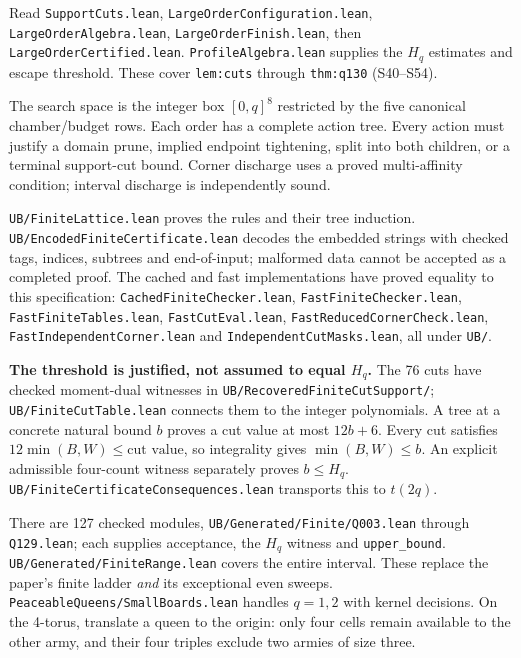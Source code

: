 \documentclass[11pt,a4paper]{article}
\newcommand{\topic}[1]{\par\vspace{6pt}{\large\bfseries\color{ink}#1}\par\vspace{2pt}}
\newcommand{\file}[1]{\mbox{\small\nolinkurl{#1}}}
\newcommand{\paperref}[1]{{\small\texttt{#1}}}
\begin{document}
Read \file{SupportCuts.lean}, \file{LargeOrderConfiguration.lean},
\file{LargeOrderAlgebra.lean}, \file{LargeOrderFinish.lean}, then
\file{LargeOrderCertified.lean}. \file{ProfileAlgebra.lean} supplies the
$H_q$ estimates and escape threshold. These cover \paperref{lem:cuts}
through \paperref{thm:q130} (S40--S54).

\newpage
\topic{The finite proof: $3\le q\le129$}
The search space is the integer box $[0,q]^8$ restricted by the five canonical
chamber/budget rows. Each order has a complete action tree. Every action
must justify a domain prune, implied endpoint tightening, split into both
children, or a terminal support-cut bound. Corner discharge uses a proved
multi-affinity condition; interval discharge is independently sound.

\file{UB/FiniteLattice.lean} proves the rules and their tree induction.
\file{UB/EncodedFiniteCertificate.lean} decodes the embedded strings with
checked tags, indices, subtrees and end-of-input; malformed data cannot be
accepted as a completed proof. The cached and fast implementations have
proved equality to this specification:
\file{CachedFiniteChecker.lean}, \file{FastFiniteChecker.lean},
\file{FastFiniteTables.lean}, \file{FastCutEval.lean},
\file{FastReducedCornerCheck.lean}, \file{FastIndependentCorner.lean}
and \file{IndependentCutMasks.lean}, all under \file{UB/}.

\textbf{The threshold is justified, not assumed to equal $H_q$.}
The 76 cuts have checked moment-dual witnesses in
\file{UB/RecoveredFiniteCutSupport/}; \file{UB/FiniteCutTable.lean}
connects them to the integer polynomials. A tree at a concrete natural bound
$b$ proves a cut value at most $12b+6$. Every cut satisfies
$12\min(B,W)\le\text{cut value}$, so integrality gives $\min(B,W)\le b$.
An explicit admissible four-count witness separately proves $b\le H_q$.
\file{UB/FiniteCertificateConsequences.lean} transports this to $t(2q)$.

There are 127 checked modules, \file{UB/Generated/Finite/Q003.lean} through
\file{Q129.lean}; each supplies acceptance, the $H_q$ witness and
\file{upper_bound}. \file{UB/Generated/FiniteRange.lean} covers the entire
interval. These replace the paper's finite ladder \emph{and} its exceptional
even sweeps. \file{PeaceableQueens/SmallBoards.lean} handles $q=1,2$
with kernel decisions. On the 4-torus, translate a queen to the origin:
only four cells remain available to the other army, and their four triples
exclude two armies of size three.
\end{document}
